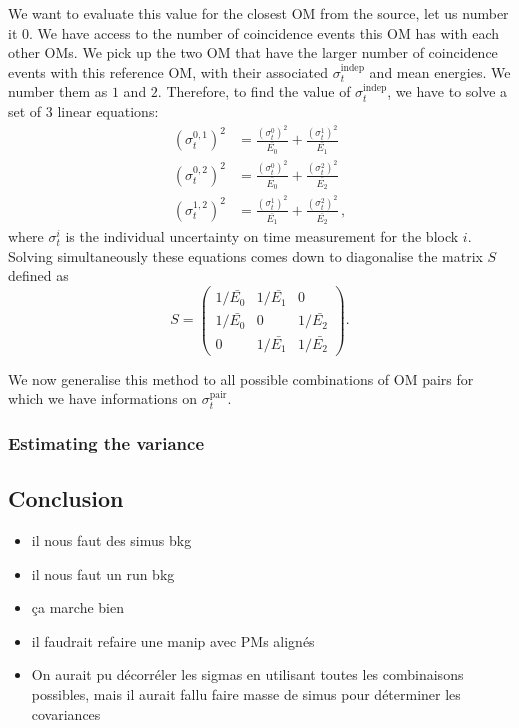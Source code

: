 We want to evaluate this value for the closest OM from the source, let us number it $0$.
We have access to the number of coincidence events this OM has with each other OMs.
We pick up the two OM that have the larger number of coincidence events with this reference OM, with their associated $\sigma_{t}^{\text{indep}}$ and mean energies.
We number them as $1$ and $2$.
Therefore, to find the value of $\sigma_{t}^{\text{indep}}$, we have to solve a set of $3$ linear equations:
\begin{align}
  (\sigma_{t}^{0,1})^{2} &= \frac{(\sigma_{t}^{0})^{2}}{\bar{E_{0}}} + \frac{(\sigma_{t}^{1})^{2}}{\bar{E_{1}}}\nonumber \\
  (\sigma_{t}^{0,2})^{2} &= \frac{(\sigma_{t}^{0})^{2}}{\bar{E_{0}}} + \frac{(\sigma_{t}^{2})^{2}}{\bar{E_{2}}}\\
  (\sigma_{t}^{1,2})^{2} &= \frac{(\sigma_{t}^{1})^{2}}{\bar{E_{1}}} + \frac{(\sigma_{t}^{2})^{2}}{\bar{E_{2}}} \nonumber\,,
  \label{eq:Co_sigma}
\end{align}
where $\sigma_{t}^{i}$ is the individual uncertainty on time measurement for the block $i$.
Solving simultaneously these equations comes down to diagonalise the matrix $S$ defined as
\begin{equation}
  S =
  \begin{pmatrix}
    1/\bar{E_{0}} & 1/\bar{E_{1}} & 0 \\
    1/\bar{E_{0}} & 0 & 1/\bar{E_{2}} \\
    0 & 1/\bar{E_{1}} & 1/\bar{E_{2}}
  \end{pmatrix}
  .
\end{equation}

We now generalise this method to all possible combinations of OM pairs for which we have informations on $\sigma_{t}^{\text{pair}}$.

\subsubsection*{Estimating the variance}



\subsection{Conclusion}
\begin{itemize}
\item il nous faut des simus bkg
\item il nous faut un run bkg
\item ça marche bien
\item il faudrait refaire une manip avec PMs alignés
  \item On aurait pu décorréler les sigmas en utilisant toutes les combinaisons possibles, mais il aurait fallu faire masse de simus pour déterminer les covariances
\end{itemize}


